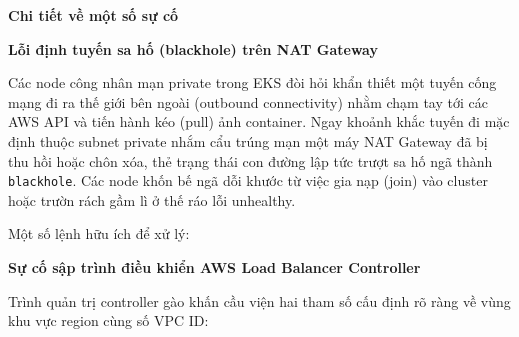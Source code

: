 \vspace{0.5em}\noindent\textbf{Chi tiết về một số sự
cố}\par

\vspace{0.5em}\noindent\textbf{Lỗi định tuyến sa hố (blackhole) trên NAT
Gateway}\par

Các node công nhân mạn private trong EKS đòi hỏi khẩn thiết một tuyến
cống mạng đi ra thế giới bên ngoài (outbound connectivity) nhằm chạm tay
tới các AWS API và tiến hành kéo (pull) ảnh container. Ngay khoảnh khắc
tuyến đi mặc định thuộc subnet private nhắm cẩu trúng mạn một máy NAT
Gateway đã bị thu hồi hoặc chôn xóa, thẻ trạng thái con đường lập tức
trượt sa hố ngã thành \texttt{blackhole}. Các node khốn bế ngã dỗi khước
từ việc gia nạp (join) vào cluster hoặc trườn rách gầm lì ở thế ráo lỗi
unhealthy.

Một số lệnh hữu ích để xử lý:

\begin{Shaded}
\begin{Highlighting}[]
 \OperatorTok{\textless{}}\OperatorTok{\textgreater{}}
\end{Highlighting}
\end{Shaded}

\vspace{0.5em}\noindent\textbf{Sự cố sập trình điều khiển AWS Load Balancer
Controller}\par

Trình quản trị controller gào khấn cầu viện hai tham số cấu định rõ ràng
về vùng khu vực region cùng số VPC ID:

\begin{Shaded}
\begin{Highlighting}[]
\end{Highlighting}
\end{Shaded}

